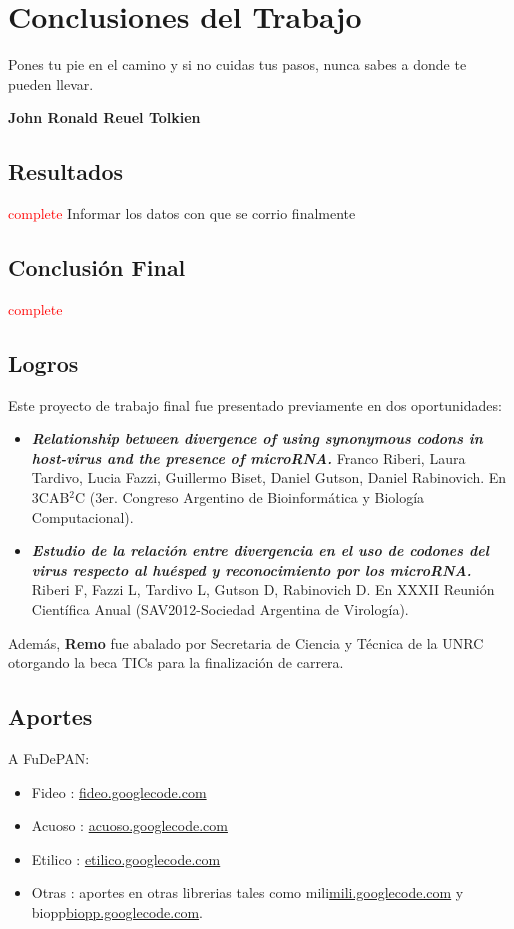 \chapter{Conclusiones del Trabajo}

\epigraph{Pones tu pie en el camino y si no cuidas
tus pasos, nunca sabes a donde te pueden
llevar.}%
{\textbf{John Ronald Reuel Tolkien}}

\section{Resultados}
\textcolor{red}{complete}
Informar los datos con que se corrio finalmente

\section{Conclusión Final}
\textcolor{red}{complete}

\section{Logros}
Este proyecto de trabajo final fue presentado previamente en dos oportunidades:
\begin{itemize}
    \item \emph{\textbf{Relationship between divergence of using synonymous codons in host-virus and the presence of microRNA.}} Franco	Riberi, Laura Tardivo, Lucia Fazzi, Guillermo Biset, Daniel Gutson, Daniel Rabinovich. En 3CAB$^{2}$C (3er. Congreso Argentino de Bioinformática y Biología Computacional).

    \item \emph{\textbf{Estudio de la relación entre divergencia  en el uso de codones del virus respecto al huésped y reconocimiento por los microRNA.}} Riberi F, Fazzi L, Tardivo L, Gutson D, Rabinovich D. En XXXII Reunión Científica Anual (SAV2012-Sociedad Argentina de Virología).    
\end{itemize}

Además, \textbf{Remo} fue abalado por Secretaria de Ciencia y Técnica de la UNRC otorgando la beca TICs para la finalización de carrera.

\section{Aportes}
\par A FuDePAN:
\begin{itemize}
    \item Fideo   : \url{fideo.googlecode.com}
    \item Acuoso  : \url{acuoso.googlecode.com}
    \item Etilico : \url{etilico.googlecode.com}
    \item Otras   : aportes en otras librerias tales como mili\url{mili.googlecode.com} y biopp\url{biopp.googlecode.com}.
\end{itemize}

